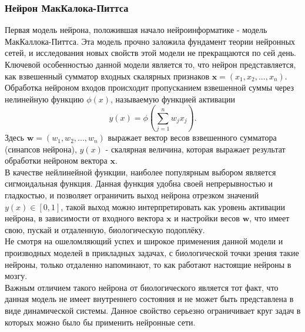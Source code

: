 \documentclass[a4paper,10pt]{article}
\begin{document}
\subsubsection{Нейрон МакКалока-Питтса}
   Первая модель нейрона, положившая начало нейроинформатике  - модель МакКаллока-Питтса. Эта модель прочно заложила фундамент теории нейронных сетей, и исследования новых свойств этой модели не   прекращаются по сей день.\\
   \indent Ключевой особенностью данной модели является то, что нейрон представляется, как взвешенный сумматор входных скалярных признаков $\boldsymbol{x}=(x_{1},x_{2},...,x_{n})$. Обработка нейроном входов происходит пропусканием взвешенной суммы через нелинейную функцию $\phi(x)$, называемую функцией активации\\
   \begin{equation}\label{eq:sum_mp}
   y(x) = \phi(\sum_{j=1}^{n}w_{j}x_{j}).
   \end{equation}
\indent Здесь $\boldsymbol{w}=(w_{1}, w_{2},...,w_{n})$ выражает вектор весов взвешенного сумматора (синапсов нейрона), $y(x)$ - скалярная величина, которая выражает результат обработки нейроном вектора $\boldsymbol{x}$.\\	
	\indent В качестве нейлинейной функции, наиболее популярным выбором является сигмоидальная функция\cite{Zaencev1999}. Данная функция удобна своей непрерывностью и гладкостью, и позволяет ограничить выход нейрона  отрезком значений $y(x)\in[0,1]$, такой выход можно интерпретировать как уровень активации нейрона, в зависимости от входного вектора $\boldsymbol{x}$ и настройки весов $\boldsymbol{w}$, что имеет свою, пускай и отдаленную, биологическую подоплёку. \\
   \indent Не смотря на ошеломляющий успех и широкое применения данной модели  и производных моделей в прикладных задачах, с биологической точки зрения такие нейроны, только отдаленно напоминают, то как работают настоящие нейроны в мозгу.\\
   \indent Важным отличием такого нейрона от биологического является тот факт, что данная модель не имеет внутреннего состояния и не может быть представлена в виде динамической системы\cite{Zaencev1999}. Данное свойство серьезно ограничивает круг задач в которых можно было бы применить нейронные сети. 
\end{document}
